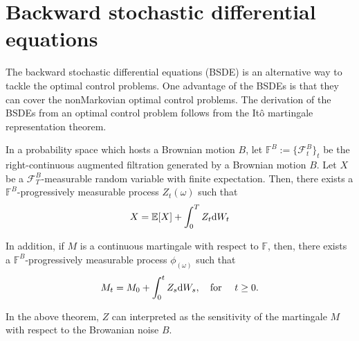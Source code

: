 \documentclass[11pt]{book}
\newcommand{\dW}{\text{\normalfont d}W}
\begin{document}
\section{Backward stochastic differential equations}
\label{sec:BSDE}
The backward stochastic differential equations (BSDE) is an alternative way to tackle the optimal control problems. One advantage of the BSDEs is that they can  cover the nonMarkovian optimal control problems. The derivation of the BSDEs from an optimal control problem follows from the It\^o martingale representation theorem. 
\begin{thm}
In a probability space which hosts a Brownian motion $B$, let $\mathbb{F}^B:=\{\mathcal{F}^B_t\}_t$ be the right-continuous augmented filtration generated by a Brownian motion $B$. 
Let $X$ be a $\mathcal{F}^B_T$-measurable random variable with finite expectation. Then, there exists a $\mathbb{F}^B$-progressively measurable process $Z_t(\omega)$ such that 
\begin{equation}
X=\mathbb{E}[X]+\int_0^TZ_t\dW_t
\end{equation}

In addition, if $M$ is a continuous martingale with respect to $\mathbb{F}$, then, there exists a $\mathbb{F}^B$-progressively measurable process $\phi_(\omega)$ such that 
\begin{equation}
M_t=M_0+\int_0^tZ_s\dW_s,~~~\textrm{for }~~~ t\ge0.
\end{equation}
\end{thm}
In the above theorem, $Z$ can interpreted as the sensitivity of the martingale $M$ with respect to the Browanian noise $B$.
\end{document}
